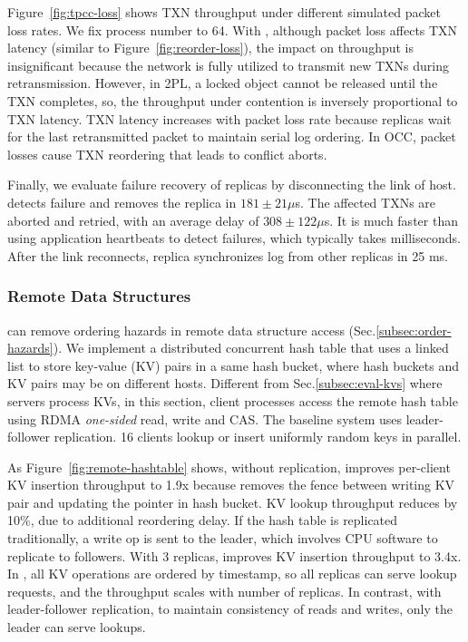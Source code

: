 Figure~\ref{fig:tpcc-loss} shows TXN throughput under different simulated packet loss rates.
We fix process number to 64.
With \sys{}, although packet loss affects TXN latency (similar to Figure~\ref{fig:reorder-loss}), the impact on throughput is insignificant because the network is fully utilized to transmit new TXNs during retransmission.
However, in 2PL, a locked object cannot be released until the TXN completes, so, the throughput under contention is inversely proportional to TXN latency.
TXN latency increases with packet loss rate because replicas wait for the last retransmitted packet to maintain serial log ordering.
In OCC, packet losses cause TXN reordering that leads to conflict aborts.

Finally, we evaluate failure recovery of replicas by disconnecting the link of host. \sys{} detects failure and removes the replica in $181 \pm 21 \mu$s. The affected TXNs are aborted and retried, with an average delay of $308 \pm 122 \mu$s. It is much faster than using application heartbeats to detect failures, which typically takes milliseconds. After the link reconnects, replica synchronizes log from other replicas in 25 ms.

\subsubsection{Remote Data Structures}
\label{subsec:data-structure}

\sys{} can remove ordering hazards in remote data structure access (Sec.\ref{subsec:order-hazards}).
We implement a distributed concurrent hash table that uses a linked list to store key-value (KV) pairs in a same hash bucket, where hash buckets and KV pairs may be on different hosts.
Different from Sec.\ref{subsec:eval-kvs} where servers process KVs, in this section, client processes access the remote hash table using RDMA \emph{one-sided} read, write and CAS.
The baseline system uses leader-follower replication.
16 clients lookup or insert uniformly random keys in parallel.

As Figure~\ref{fig:remote-hashtable} shows, without replication, \sys{} improves per-client KV insertion throughput to 1.9x because \sys{} removes the fence between writing KV pair and updating the pointer in hash bucket.
KV lookup throughput reduces by 10\%, due to additional reordering delay.
If the hash table is replicated traditionally, a write op is sent to the leader, which involves CPU software to replicate to followers.
With 3 replicas, \sys{} improves KV insertion throughput to 3.4x.
In \sys{}, all KV operations are ordered by timestamp, so all replicas can serve lookup requests, and the throughput scales with number of replicas.
In contrast, with leader-follower replication, to maintain consistency of reads and writes, only the leader can serve lookups.


